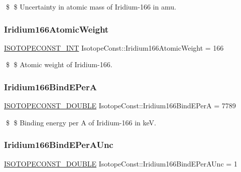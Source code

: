 \$ \$ Uncertainty in atomic mass of Iridium-\/166 in amu. \mbox{\label{group___isotope_const-_iridium-_ir166_gab515c42345034dd6536e4ae90d27a80a}} 
\subsubsection{\texorpdfstring{Iridium166\+Atomic\+Weight}{Iridium166AtomicWeight}}
{\footnotesize\ttfamily \mbox{\hyperlink{group___isotope_const-_macros_ga5f18360b3e99483a35c32d789e62621c}{I\+S\+O\+T\+O\+P\+E\+C\+O\+N\+S\+T\+\_\+\+I\+NT}} Isotope\+Const\+::\+Iridium166\+Atomic\+Weight = 166}

\$ \$ Atomic weight of Iridium-\/166. \mbox{\label{group___isotope_const-_iridium-_ir166_ga0f9a3e83230c6d476282966e557dd6ad}} 
\subsubsection{\texorpdfstring{Iridium166\+Bind\+E\+PerA}{Iridium166BindEPerA}}
{\footnotesize\ttfamily \mbox{\hyperlink{group___isotope_const-_macros_ga8f45a7272ce02c0b4c65c44636ed719a}{I\+S\+O\+T\+O\+P\+E\+C\+O\+N\+S\+T\+\_\+\+D\+O\+U\+B\+LE}} Isotope\+Const\+::\+Iridium166\+Bind\+E\+PerA = 7789}

\$ \$ Binding energy per A of Iridium-\/166 in keV. \mbox{\label{group___isotope_const-_iridium-_ir166_gaca257279b0aa5fbc72816d59572f5baa}} 
\subsubsection{\texorpdfstring{Iridium166\+Bind\+E\+Per\+A\+Unc}{Iridium166BindEPerAUnc}}
{\footnotesize\ttfamily \mbox{\hyperlink{group___isotope_const-_macros_ga8f45a7272ce02c0b4c65c44636ed719a}{I\+S\+O\+T\+O\+P\+E\+C\+O\+N\+S\+T\+\_\+\+D\+O\+U\+B\+LE}} Isotope\+Const\+::\+Iridium166\+Bind\+E\+Per\+A\+Unc = 1}


